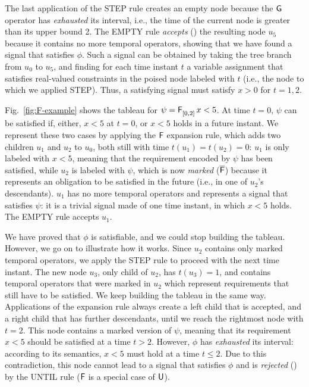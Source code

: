 \documentclass[acmsmall,screen]{acmart}
\begin{document}
The last application of the \textsf{STEP} rule creates an empty node because the $\mathsf{G}$ operator
has \emph{exhausted} its interval, i.e., the time of the current node is greater than its upper bound 2.
The \textsf{EMPTY} rule \emph{accepts} (\cmark) the resulting node $u_5$
because it contains no more temporal operators,
showing that we have found a signal that satisfies $\phi$.
Such a signal can be obtained by taking the tree branch from $u_0$ to $u_5$,
and finding for each time instant $t$ a variable assignment that satisfies real-valued constraints
in the poised node labeled with $t$ (i.e., the node to which we applied \textsf{STEP}).
Thus, a satisfying signal must satisfy $x>0$ for $t = 1, 2$.

Fig.~\ref{fig:F-example} shows the tableau for $\psi = \mathop{\mathsf{\mathsf{F}}^{{}}_{[0,2]}} x < 5$.
At time $t = 0$, $\psi$ can be satisfied if, either, $x < 5$ at $t = 0$,
or $x < 5$ holds in a future instant.
We represent these two cases by applying the $\mathsf{F}$ expansion rule,
which adds two children $u_1$ and $u_2$ to $u_0$, both still with time $t(u_1) = t(u_2) = 0$:
$u_1$ is only labeled with $x < 5$, meaning that the requirement encoded by $\psi$ has been satisfied,
while $u_2$ is labeled with $\psi$, which is now \emph{marked} ($\overline{\mathsf{F}}$) because
it represents an obligation to be satisfied in the future (i.e., in one of $u_2$'s descendants).
$u_1$ has no more temporal operators and represents a signal that satisfies $\psi$:
it is a trivial signal made of one time instant, in which $x < 5$ holds.
The \textsf{EMPTY} rule accepts $u_1$.

We have proved that $\phi$ is satisfiable, and we could stop building the tableau.
However, we go on to illustrate how it works.
Since $u_2$ contains only marked temporal operators, we apply the \textsf{STEP} rule to proceed with the next time instant.
The new node $u_3$, only child of $u_2$, has $t(u_3) = 1$,
and contains temporal operators that were marked in $u_2$
which represent requirements that still have to be satisfied.
We keep building the tableau in the same way.
Applications of the expansion rule always create a left child that is accepted, 
and a right child that has further descendants, until we reach the rightmost node with $t = 2$.
This node contains a marked version of $\psi$, meaning that its requirement $x < 5$ should be satisfied at a time $t > 2$.
However, $\phi$ has \emph{exhausted} its interval: according to its semantics,
$x < 5$ must hold at a time $t \leq 2$.
Due to this contradiction, this node cannot lead to a signal that satisfies $\phi$ and
is \emph{rejected} (\xmark) by the \textsf{UNTIL} rule ($\mathsf{F}$ is a special case of $\mathsf{U}$).
\end{document}
